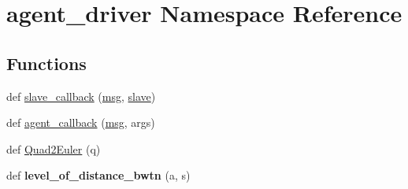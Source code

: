 \hypertarget{namespaceagent__driver}{}\section{agent\+\_\+driver Namespace Reference}
\label{namespaceagent__driver}
\subsection*{Functions}
\begin{DoxyCompactItemize}
\item 
def \hyperlink{namespaceagent__driver_a8533f9b2a436a7a18b583d2a3cdd2bb0}{slave\+\_\+callback} (\hyperlink{namespaceagent__driver_aa31ae9eef11875e6a4a6cf2841c7244c}{msg}, \hyperlink{namespaceagent__driver_a5fb9e432fe347e66d24555c692692cea}{slave})
\item 
def \hyperlink{namespaceagent__driver_ac3e30dc982f1af57da8344c9cbfa0dd6}{agent\+\_\+callback} (\hyperlink{namespaceagent__driver_aa31ae9eef11875e6a4a6cf2841c7244c}{msg}, args)
\item 
def \hyperlink{namespaceagent__driver_aa2528ff29007a94600f692a960ec32dd}{Quad2\+Euler} (q)
\item 
\mbox{\label{namespaceagent__driver_a787c900ffcbbc07ba51b9b599ab0c6fa}} 
def {\bfseries level\+\_\+of\+\_\+distance\+\_\+bwtn} (a, s)
\end{DoxyCompactItemize}
